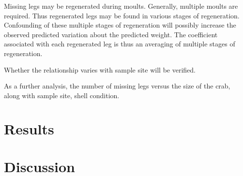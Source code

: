 \documentclass[letterpaper,10pt]{article}
\begin{document}
Missing legs may be regenerated during moults. 
Generally, multiple moults are required.  
Thus regenerated legs may be found in various stages of regeneration. 
Confounding of these multiple stages of regeneration will possibly increase the observed predicted variation about the predicted weight.
The coefficient associated with each regenerated leg is thus an averaging of multiple stages of regeneration.

Whether the relationship varies with sample site will be verified. 

As a further analysis, the number of missing legs versus the size of the crab, along with sample site, shell condition.

\section{Results}






\section{Discussion}



\newpage
\end{document}
